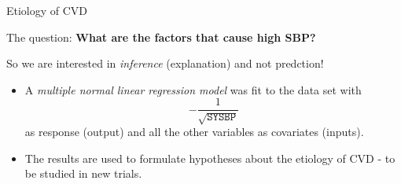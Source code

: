 \documentclass[10pt,ignorenonframetext,]{beamer}
\begin{document}
\begin{frame}

\begin{block}{Etiology of CVD}

\vspace{3mm}

The question: \textbf{What are the factors that cause high SBP?}

\vspace{2mm}

So we are interested in \emph{inference} (explanation) and not
predction!

\vspace{4mm}

\begin{itemize}
\item
  A \emph{multiple normal linear regression model} was fit to the data
  set with \[-\frac{1}{\sqrt{\texttt{SYSBP}}}\] as response (output) and
  all the other variables as covariates (inputs).
\item
  The results are used to formulate hypotheses about the etiology of CVD
  - to be studied in new trials.
\end{itemize}

\end{block}

\end{frame}
\end{document}
